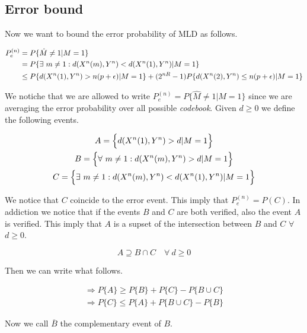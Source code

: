 \subsection{Error bound}

Now we want to bound the error probability of MLD as follows.

\begin{equation}
	\begin{aligned}
	P_e^{(n)} & =P\{\hat{M}\neq 1 | M = 1\} \\
	& = P \{ \exists \ m \neq 1 : d(X^n(m),Y^n) < d(X^n(1),Y^n) | M=1 \}\\
	& \leq P \{ d(X^n(1),Y^n) >n(p+\epsilon)|M=1\}+(2^{nR}-1)P \{ d(X^n(2),Y^n) \leq n(p+\epsilon)|M=1\}
	\end{aligned}
	\label{eq:3.5bound}
\end{equation}

We notiche that we are allowed to write $P_e^{(n)}  =P \{\hat{M}\neq 1 | M = 1\}$ since we are averaging the error probability over all possible \textit{codebook}. Given $d \geq 0$ we define the following events.

\begin{gather*}
	A = \Big \{ d(X^n(1),Y^n)>d | M = 1\Big \} \\
	B = \Big \{ \forall \  m \neq 1 : d(X^n(m),Y^n)>d | M=1 \Big \} \\
 	C = \Big\{ \exists \ m \neq 1 : d(X^n(m),Y^n) < d(X^n(1),Y^n) | M=1 \Big \}
\end{gather*}

We notice that $C$ coincide to the error event. This imply that $P_e^{(n)}=P(C)$. In addiction we notice that if the events $B$ and $C$ are both verified, also the event $A$ is verified. This imply that $A$ is a supset of the intersection between $B$ and $C$ $\forall$ $d \geq 0$.

\begin{equation}
		A \supseteq B \cap C \quad \forall \  d\geq0
	\label{eq:3.5condition}
\end{equation}

Then we can write what follows.

\begin{equation}
	\begin{gathered}
		\Rightarrow P \{ A \} \geq P\{B\}+P\{C \} - P \{ B \cup C \} \\
		\Rightarrow P \{ C \} \leq P \{ A \} + P \{ B \cup C \} - P\{B \}
	\end{gathered}
\end{equation}

Now we call $\overline{B}$ the complementary event of  $B$.

